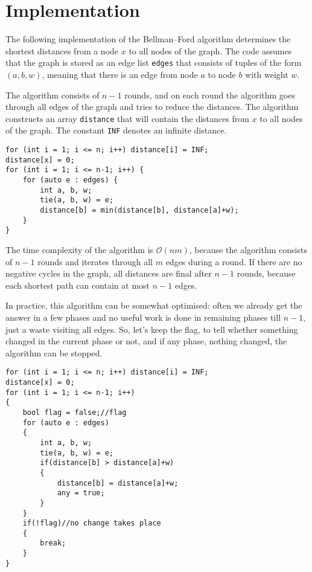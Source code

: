 \documentclass[twoside,12pt,a4paper,english]{book}
\theoremstyle{definition}
\theoremstyle{problemstyle}
\theoremstyle{problemstyle}
\theoremstyle{problemstyle}
\begin{document}
\section{Implementation}

The following implementation of the
Bellman–Ford algorithm determines the shortest distances
from a node $x$ to all nodes of the graph.
The code assumes that the graph is stored
as an edge list \texttt{edges}
that consists of tuples of the form $(a,b,w)$,
meaning that there is an edge from node $a$ to node $b$
with weight $w$.

The algorithm consists of $n-1$ rounds,
and on each round the algorithm goes through
all edges of the graph and tries to
reduce the distances.
The algorithm constructs an array \texttt{distance}
that will contain the distances from $x$
to all nodes of the graph.
The constant \texttt{INF} denotes an infinite distance.

\begin{tcolorbox}[title=Solution]

\begin{lstlisting}
for (int i = 1; i <= n; i++) distance[i] = INF;
distance[x] = 0;
for (int i = 1; i <= n-1; i++) {
    for (auto e : edges) {
        int a, b, w;
        tie(a, b, w) = e;
        distance[b] = min(distance[b], distance[a]+w);
    }
}
\end{lstlisting}

The time complexity of the algorithm is $\mathcal{O}(nm)$,
because the algorithm consists of $n-1$ rounds and
iterates through all $m$ edges during a round.
If there are no negative cycles in the graph,
all distances are final after $n-1$ rounds,
because each shortest path can contain at most $n-1$ edges.

\end{tcolorbox}

In practice, this algorithm can be somewhat optimised: often we already get the answer in a few phases and no useful work is done in remaining phases till $n-1$, just a waste visiting all edges. So, let's keep the flag, to tell whether something changed in the current phase or not, and if any phase, nothing changed, the algorithm can be stopped.

\begin{tcolorbox}[title=Solution]

\begin{lstlisting}
for (int i = 1; i <= n; i++) distance[i] = INF;
distance[x] = 0;
for (int i = 1; i <= n-1; i++) 
{
    bool flag = false;//flag
    for (auto e : edges) 
    {
        int a, b, w;
        tie(a, b, w) = e;
        if(distance[b] > distance[a]+w)
        {
            distance[b] = distance[a]+w;
            any = true;
        }
    }
    if(!flag)//no change takes place
    {
        break;
    }
}
\end{lstlisting}

\end{tcolorbox}
\end{document}
